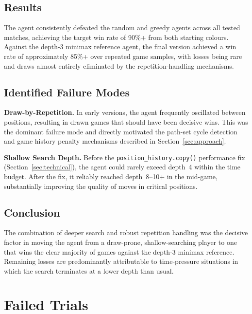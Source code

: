 \documentclass[10pt,a4paper]{article}
\begin{document}
\subsection{Results}

The agent consistently defeated the random and greedy agents across all tested matches, achieving the target win rate of 90\%+ from both starting colours. Against the depth-3 minimax reference agent, the final version achieved a win rate of approximately 85\%+ over repeated game samples, with losses being rare and draws almost entirely eliminated by the repetition-handling mechanisms.

\subsection{Identified Failure Modes}

\textbf{Draw-by-Repetition.}
In early versions, the agent frequently oscillated between positions, resulting in drawn games that should have been decisive wins. This was the dominant failure mode and directly motivated the path-set cycle detection and game history penalty mechanisms described in Section~\ref{sec:approach}.

\textbf{Shallow Search Depth.}
Before the \texttt{position\_history.copy()} performance fix (Section~\ref{sec:technical}), the agent could rarely exceed depth~4 within the time budget. After the fix, it reliably reached depth~8--10+ in the mid-game, substantially improving the quality of moves in critical positions.

\subsection{Conclusion}

The combination of deeper search and robust repetition handling was the decisive factor in moving the agent from a draw-prone, shallow-searching player to one that wins the clear majority of games against the depth-3 minimax reference. Remaining losses are predominantly attributable to time-pressure situations in which the search terminates at a lower depth than usual.

\section{Failed Trials}
\label{sec:failed}
\end{document}
